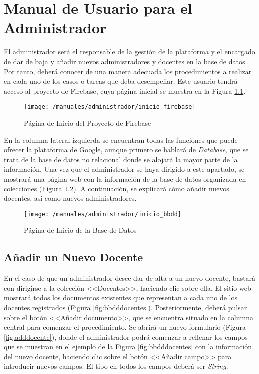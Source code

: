 \chapter{Manual de Usuario para el Administrador}
\label{chap:manadmin}

El administrador será el responsable de la gestión de la plataforma y el encargado de dar de baja y añadir nuevos administradores y docentes en la base de datos. Por tanto, deberá conocer de una manera adecuada los procedimientos a realizar en cada uno de los casos o tareas que deba desempeñar. Este usuario tendrá acceso al proyecto de Firebase, cuya página inicial se muestra en la Figura \ref{fig:maniniciofirebase}.

\begin{figure}[!h]
	\begin{center}
		\texttt{[image: /manuales/administrador/inicio\_firebase]}
		\caption{Página de Inicio del Proyecto de Firebase}
		\label{fig:maniniciofirebase}
	\end{center}
\end{figure}

\clearpage

En la columna lateral izquierda se encuentran todas las funciones que puede ofrecer la plataforma de Google, aunque primero se hablará de \textit{Database}, que se trata de la base de datos no relacional donde se alojará la mayor parte de la información. Una vez que el administrador se haya dirigido a este apartado, se mostrará una página web con la información de la base de datos organizada en colecciones (Figura \ref{fig:iniciobbdd}). A continuación, se explicará cómo añadir nuevos docentes, así como nuevos administradores.

\begin{figure}[!h]
	\begin{center}
		\texttt{[image: /manuales/administrador/inicio\_bbdd]}
		\caption{Página de Inicio de la Base de Datos}
		\label{fig:iniciobbdd}
	\end{center}
\end{figure}

\clearpage

\section*{Añadir un Nuevo Docente}
En el caso de que un administrador desee dar de alta a un nuevo docente, bastará con dirigirse a la colección <<Docentes>>, haciendo clic sobre ella. El sitio web mostrará todos los documentos existentes que representan a cada uno de los docentes registrados (Figura \ref{fig:bbdddocentes}). Posteriormente, deberá pulsar sobre el botón <<Añadir documento>>, que se encuentra situado en la columna central para comenzar el procedimiento. Se abrirá un nuevo formulario (Figura \ref{fig:adddocente}), donde el administrador podrá comenzar a rellenar los campos que se muestran en el ejemplo de la Figura \ref{fig:bbdddocentes} con la información del nuevo docente, haciendo clic sobre el botón <<Añadir campo>> para introducir nuevos campos. El tipo en todos los campos deberá ser \textit{String}.

